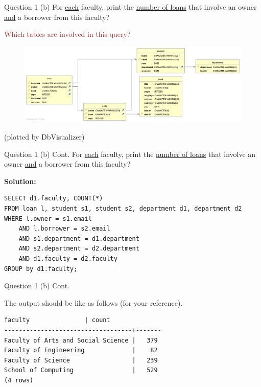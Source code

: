 \begin{frame}[fragile]{Question 1 (b)}
For \underline{each} faculty, print the \underline{number of loans} that involve an owner \underline{and} a borrower from this faculty?
\vspace{10pt}

\textcolor{brown}{Which tables are involved in this query?}
\begin{figure}
	\includegraphics[width=1\textwidth]{t1/images/t1-end.png}
\end{figure}\vspace{-10pt}
{\tiny(plotted by DbVisualizer)}
\end{frame}

\begin{frame}[fragile]{Question 1 (b) Cont.}
For \underline{each} faculty, print the \underline{number of loans} that involve an owner \underline{and} a borrower from this faculty?
\vspace{10pt}

\textbf{Solution:}\\
\begin{lstlisting}
SELECT d1.faculty, COUNT(*)
FROM loan l, student s1, student s2, department d1, department d2
WHERE l.owner = s1.email 
	AND l.borrower = s2.email
	AND s1.department = d1.department
	AND s2.department = d2.department
	AND d1.faculty = d2.faculty
GROUP by d1.faculty;
\end{lstlisting} \vspace{10pt}
\end{frame}

\begin{frame}[fragile]{Question 1 (b) Cont.}

The output should be like as follows (for your reference).\\ \vspace{10pt}
\begin{lstlisting}[style=terminal]
             faculty               | count
-----------------------------------+-------
Faculty of Arts and Social Science |   379
Faculty of Engineering             |    82
Faculty of Science                 |   239
School of Computing                |   529
(4 rows)	
\end{lstlisting}
\end{frame}


